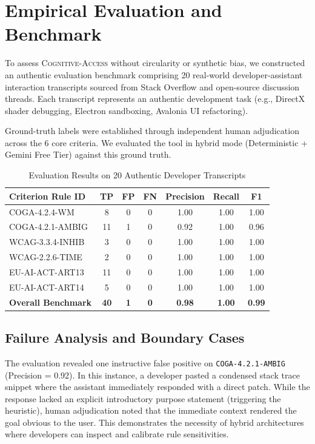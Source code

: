 \documentclass[conference]{IEEEtran}
\begin{document}
\section{Empirical Evaluation and Benchmark}
To assess \textsc{Cognitive-Access} without circularity or synthetic bias, we constructed an authentic evaluation benchmark comprising 20 real-world developer-assistant interaction transcripts sourced from Stack Overflow and open-source discussion threads. Each transcript represents an authentic development task (e.g., DirectX shader debugging, Electron sandboxing, Avalonia UI refactoring).

Ground-truth labels were established through independent human adjudication across the 6 core criteria. We evaluated the tool in hybrid mode (Deterministic + Gemini Free Tier) against this ground truth.

\begin{table}[h]
\caption{Evaluation Results on 20 Authentic Developer Transcripts}
\label{tab:eval}
\centering
\scriptsize
\begin{tabular}{lcccccc}
\toprule
\textbf{Criterion Rule ID} & \textbf{TP} & \textbf{FP} & \textbf{FN} & \textbf{Precision} & \textbf{Recall} & \textbf{F1} \\
\midrule
COGA-4.2.4-WM & 8 & 0 & 0 & 1.00 & 1.00 & 1.00 \\
COGA-4.2.1-AMBIG & 11 & 1 & 0 & 0.92 & 1.00 & 0.96 \\
WCAG-3.3.4-INHIB & 3 & 0 & 0 & 1.00 & 1.00 & 1.00 \\
WCAG-2.2.6-TIME & 2 & 0 & 0 & 1.00 & 1.00 & 1.00 \\
EU-AI-ACT-ART13 & 11 & 0 & 0 & 1.00 & 1.00 & 1.00 \\
EU-AI-ACT-ART14 & 5 & 0 & 0 & 1.00 & 1.00 & 1.00 \\
\midrule
\textbf{Overall Benchmark} & \textbf{40} & \textbf{1} & \textbf{0} & \textbf{0.98} & \textbf{1.00} & \textbf{0.99} \\
\bottomrule
\end{tabular}
\end{table}

\subsection{Failure Analysis and Boundary Cases}
The evaluation revealed one instructive false positive on \texttt{COGA-4.2.1-AMBIG} (Precision = 0.92). In this instance, a developer pasted a condensed stack trace snippet where the assistant immediately responded with a direct patch. While the response lacked an explicit introductory purpose statement (triggering the heuristic), human adjudication noted that the immediate context rendered the goal obvious to the user. This demonstrates the necessity of hybrid architectures where developers can inspect and calibrate rule sensitivities.
\end{document}
